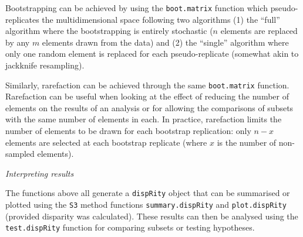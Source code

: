 \documentclass[12pt,letterpaper]{article}
\renewcommand{\subsection}[1]{%
\bigskip
\begin{center}
\begin{large}
\normalfont\itshape #1
\end{large}
\end{center}}
\newcommand{\disp}{\texttt{dispRity} }
\begin{document}
Bootstrapping can be achieved by using the \texttt{boot.matrix} function which pseudo-replicates the multidimensional space following two algorithms (1) the ``full'' algorithm where the bootstrapping is entirely stochastic ($n$ elements are replaced by any $m$ elements drawn from the data) and (2) the ``single'' algorithm where only one random element is replaced for each pseudo-replicate (somewhat akin to jackknife resampling).


Similarly, rarefaction can be achieved through the same \texttt{boot.matrix} function.
Rarefaction can be useful when looking at the effect of reducing the number of elements on the results of an analysis or for allowing the comparisons of subsets with the same number of elements in each.
In practice, rarefaction limits the number of elements to be drawn for each bootstrap replication: only $n-x$ elements are selected at each bootstrap replicate (where $x$ is the number of non-sampled elements).

\subsection{Interpreting results}
The functions above all generate a \disp object that can be summarised or plotted using the \texttt{S3} method functions \texttt{summary.dispRity} and \texttt{plot.dispRity} (provided disparity was calculated).
These results can then be analysed using the \texttt{test.dispRity} function for comparing subsets or testing hypotheses.
\end{document}
